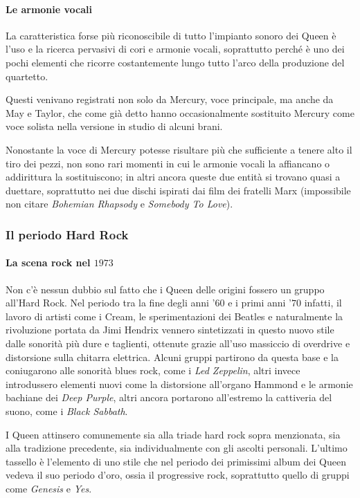 \documentclass[12pt]{article}
\begin{document}
\paragraph{Le armonie vocali}
La caratteristica forse più riconoscibile di tutto l'impianto sonoro dei Queen è l'uso e la ricerca pervasivi di cori e armonie vocali, soprattutto perché è uno dei pochi elementi che ricorre costantemente lungo tutto l'arco della produzione del quartetto.

Questi venivano registrati non solo da Mercury, voce principale, ma anche da May e Taylor, che come già detto hanno occasionalmente sostituito Mercury come voce solista nella versione in studio di alcuni brani.

Nonostante la voce di Mercury potesse risultare più che sufficiente a tenere alto il tiro dei pezzi, non sono rari momenti in cui le armonie vocali la affiancano o addirittura la sostituiscono; in altri ancora queste due entità si trovano quasi a duettare, soprattutto nei due dischi ispirati dai film dei fratelli Marx (impossibile non citare \emph{Bohemian Rhapsody} e \emph{Somebody To Love}).

\subsubsection{Il periodo Hard Rock}
\paragraph{La scena rock nel \(1973\)}
Non c'è nessun dubbio sul fatto che i Queen delle origini fossero un gruppo all'Hard Rock. Nel periodo tra la fine degli anni '\(60\) e i primi anni '\(70\) infatti, il lavoro di artisti come i Cream, le sperimentazioni dei Beatles e naturalmente la rivoluzione portata da Jimi Hendrix vennero sintetizzati in questo nuovo stile dalle sonorità più dure e taglienti, ottenute grazie all'uso massiccio di overdrive e distorsione sulla chitarra elettrica. Alcuni gruppi partirono da questa base e la coniugarono alle sonorità blues rock, come i \emph{Led Zeppelin}, altri invece introdussero elementi nuovi come la distorsione all'organo Hammond e le armonie bachiane dei \emph{Deep Purple}, altri ancora portarono all'estremo la cattiveria del suono, come i \emph{Black Sabbath}.

I Queen attinsero comunemente sia alla triade hard rock sopra menzionata, sia alla tradizione precedente, sia individualmente con gli ascolti personali. L'ultimo tassello è l'elemento di uno stile che nel periodo dei primissimi album dei Queen vedeva il suo periodo d'oro, ossia il progressive rock, soprattutto quello di gruppi come \emph{Genesis} e \emph{Yes}.
\end{document}
